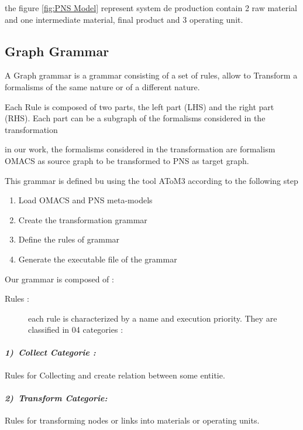the figure \ref{fig:PNS Model} represent system de production contain 2 raw material and one intermediate material, final product and 3 operating unit.





\pagebreak
\subsection{Graph Grammar}
A Graph grammar is a grammar consisting of a set of rules, allow to 
Transform a formalisms of the same nature or of a different nature. 

Each Rule is composed of two parts, the left part (LHS) and the right part (RHS).
Each part can be a subgraph of the formalisms considered in the transformation

in our work, the formalisms considered in the transformation are formalism
OMACS as source graph to be transformed to PNS as target graph.

This grammar is defined bu using the tool AToM3 according to the following step

\begin{enumerate}
	\item Load OMACS and PNS meta-models
	\item Create the transformation grammar
	\item Define the rules of grammar
	\item Generate the executable file of the grammar
\end{enumerate}

Our grammar is composed of :
\begin{description}
	\item [{Rules :}]  each rule is characterized
	by a name and execution priority. They are classified in 04 categories :
\end{description}


\paragraph{\emph{1)~Collect Categorie :} } 
Rules for Collecting and create relation between some entitie.
 
\paragraph{\emph{2)~Transform Categorie:} } 
Rules for transforming nodes or links into materials or operating units.
 

